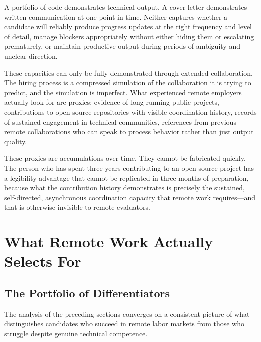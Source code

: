\documentclass[12pt, a4paper]{article}
\theoremstyle{plain}
\theoremstyle{definition}
\theoremstyle{remark}
\begin{document}
A portfolio of code demonstrates technical output.
A cover letter demonstrates written communication at one point in time.
Neither captures whether a candidate will reliably produce progress updates
at the right frequency and level of detail,
manage blockers appropriately without either hiding them or escalating prematurely,
or maintain productive output during periods of ambiguity and unclear direction.

These capacities can only be fully demonstrated through extended collaboration.
The hiring process is a compressed simulation of the collaboration it is trying to predict,
and the simulation is imperfect.
What experienced remote employers actually look for are proxies:
evidence of long-running public projects, contributions to open-source repositories
with visible coordination history, records of sustained engagement in technical communities,
references from previous remote collaborations who can speak to
process behavior rather than just output quality.

These proxies are accumulations over time.
They cannot be fabricated quickly.
The person who has spent three years contributing to an open-source project
has a legibility advantage that cannot be replicated in three months of preparation,
because what the contribution history demonstrates is precisely
the sustained, self-directed, asynchronous coordination capacity
that remote work requires---and that is otherwise invisible to remote evaluators.

\section{What Remote Work Actually Selects For}
\label{sec:selection}

\subsection{The Portfolio of Differentiators}

The analysis of the preceding sections converges on a consistent picture
of what distinguishes candidates who succeed in remote labor markets
from those who struggle despite genuine technical competence.
\end{document}
